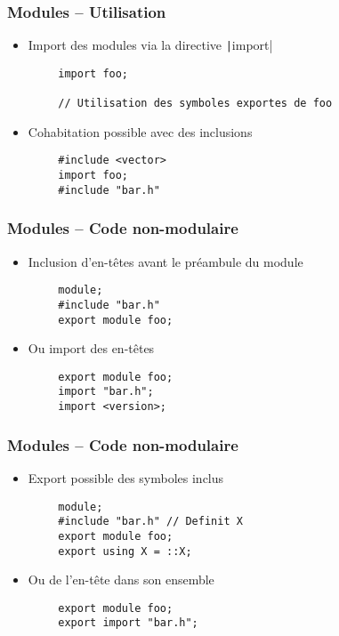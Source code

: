 \documentclass[C++.tex]{subfiles}
\begin{document}
\begin{frame}[fragile]
	\frametitle{Modules -- Utilisation}
	\begin{itemize}
		\item Import des modules via la directive \texttt|import|
	\end{itemize}

	\begin{verbatim}
		import foo;

		// Utilisation des symboles exportes de foo
	\end{verbatim}

	\begin{itemize}
		\item Cohabitation possible avec des inclusions
	\end{itemize}

	\begin{verbatim}
		#include <vector>
		import foo;
		#include "bar.h"
	\end{verbatim}
\end{frame}

\begin{frame}[fragile]
	\frametitle{Modules -- Code non-modulaire}
	\begin{itemize}
		\item Inclusion d'en-têtes avant le préambule du module
	\end{itemize}


	\begin{verbatim}
		module;
		#include "bar.h"
		export module foo;
	\end{verbatim}

	\begin{itemize}
		\item Ou import des en-têtes
	\end{itemize}

	\begin{verbatim}
		export module foo;
		import "bar.h";
		import <version>;
	\end{verbatim}
\end{frame}

\begin{frame}[fragile]
	\frametitle{Modules -- Code non-modulaire}
	\begin{itemize}
		\item Export possible des symboles inclus
	\end{itemize}

	\begin{verbatim}
		module;
		#include "bar.h" // Definit X
		export module foo;
		export using X = ::X;
	\end{verbatim}

	\begin{itemize}
		\item Ou de l'en-tête dans son ensemble
	\end{itemize}

	\begin{verbatim}
		export module foo;
		export import "bar.h";
	\end{verbatim}
\end{frame}
\end{document}
